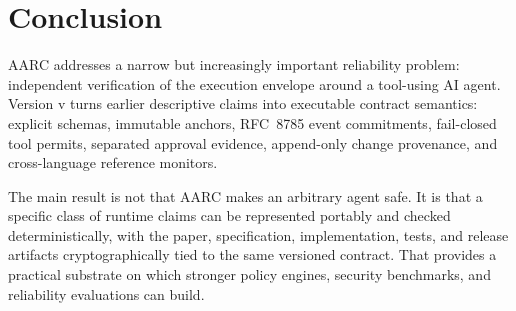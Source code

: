 \documentclass{article}
\begin{document}
\section{Conclusion}

AARC addresses a narrow but increasingly important reliability problem:
independent verification of the execution envelope around a tool-using AI
agent. Version v\specVersion{} turns earlier descriptive claims into executable
contract semantics: explicit schemas, immutable anchors, RFC~8785 event
commitments, fail-closed tool permits, separated approval evidence, append-only
change provenance, and cross-language reference monitors.

The main result is not that AARC makes an arbitrary agent safe. It is that a
specific class of runtime claims can be represented portably and checked
deterministically, with the paper, specification, implementation, tests, and
release artifacts cryptographically tied to the same versioned contract. That
provides a practical substrate on which stronger policy engines, security
benchmarks, and reliability evaluations can build.



\end{document}
